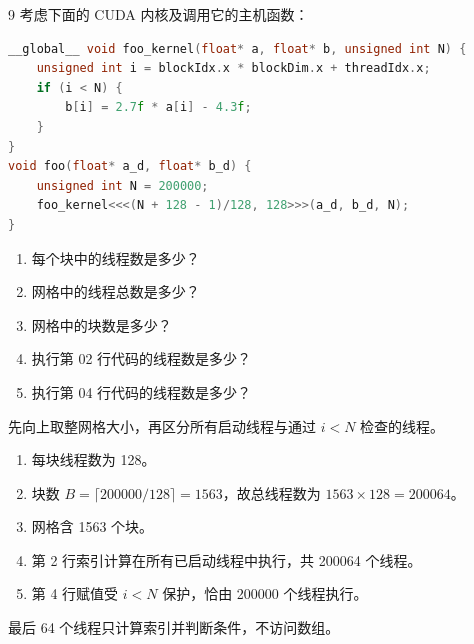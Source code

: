 \begin{solutionexercise}{9}
\problemheading 考虑下面的 CUDA 内核及调用它的主机函数：
\begin{lstlisting}[language=C++,firstnumber=1]
__global__ void foo_kernel(float* a, float* b, unsigned int N) {
    unsigned int i = blockIdx.x * blockDim.x + threadIdx.x;
    if (i < N) {
        b[i] = 2.7f * a[i] - 4.3f;
    }
}
void foo(float* a_d, float* b_d) {
    unsigned int N = 200000;
    foo_kernel<<<(N + 128 - 1)/128, 128>>>(a_d, b_d, N);
}
\end{lstlisting}
\begin{enumerate}[label=\alph*.,leftmargin=2.2em]
  \item 每个块中的线程数是多少？
  \item 网格中的线程总数是多少？
  \item 网格中的块数是多少？
  \item 执行第 02 行代码的线程数是多少？
  \item 执行第 04 行代码的线程数是多少？
\end{enumerate}

\approachheading 先向上取整网格大小，再区分所有启动线程与通过 $i<N$ 检查的线程。

\answerheading
\begin{enumerate}[label=\alph*.,leftmargin=2.2em]
  \item 每块线程数为 128。
  \item 块数 $B=\lceil200000/128\rceil=1563$，故总线程数为
  $1563\times128=200064$。
  \item 网格含 1563 个块。
  \item 第 2 行索引计算在所有已启动线程中执行，共 200064 个线程。
  \item 第 4 行赋值受 $i<N$ 保护，恰由 200000 个线程执行。
\end{enumerate}
最后 64 个线程只计算索引并判断条件，不访问数组。


\end{solutionexercise}
